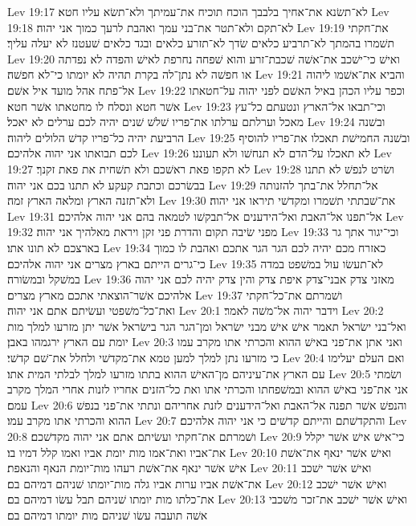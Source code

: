 Lev 19:17  לא־תשׂנא את־אחיך בלבבך הוכח תוכיח את־עמיתך ולא־תשׂא עליו חטא׃
Lev 19:18  לא־תקם ולא־תטר את־בני עמך ואהבת לרעך כמוך אני יהוה׃
Lev 19:19  את־חקתי תשׁמרו בהמתך לא־תרביע כלאים שׂדך לא־תזרע כלאים ובגד כלאים שׁעטנז לא יעלה עליך׃
Lev 19:20  ואישׁ כי־ישׁכב את־אשׁה שׁכבת־זרע והוא שׁפחה נחרפת לאישׁ והפדה לא נפדתה או חפשׁה לא נתן־לה בקרת תהיה לא יומתו כי־לא חפשׁה׃
Lev 19:21  והביא את־אשׁמו ליהוה אל־פתח אהל מועד איל אשׁם׃
Lev 19:22  וכפר עליו הכהן באיל האשׁם לפני יהוה על־חטאתו אשׁר חטא ונסלח לו מחטאתו אשׁר חטא׃
Lev 19:23  וכי־תבאו אל־הארץ ונטעתם כל־עץ מאכל וערלתם ערלתו את־פריו שׁלשׁ שׁנים יהיה לכם ערלים לא יאכל׃
Lev 19:24  ובשׁנה הרביעת יהיה כל־פריו קדשׁ הלולים ליהוה׃
Lev 19:25  ובשׁנה החמישׁת תאכלו את־פריו להוסיף לכם תבואתו אני יהוה אלהיכם׃
Lev 19:26  לא תאכלו על־הדם לא תנחשׁו ולא תעוננו׃
Lev 19:27  לא תקפו פאת ראשׁכם ולא תשׁחית את פאת זקנך׃
Lev 19:28  ושׂרט לנפשׁ לא תתנו בבשׂרכם וכתבת קעקע לא תתנו בכם אני יהוה׃
Lev 19:29  אל־תחלל את־בתך להזנותה ולא־תזנה הארץ ומלאה הארץ זמה׃
Lev 19:30  את־שׁבתתי תשׁמרו ומקדשׁי תיראו אני יהוה׃
Lev 19:31  אל־תפנו אל־האבת ואל־הידענים אל־תבקשׁו לטמאה בהם אני יהוה אלהיכם׃
Lev 19:32  מפני שׂיבה תקום והדרת פני זקן ויראת מאלהיך אני יהוה׃
Lev 19:33  וכי־יגור אתך גר בארצכם לא תונו אתו׃
Lev 19:34  כאזרח מכם יהיה לכם הגר הגר אתכם ואהבת לו כמוך כי־גרים הייתם בארץ מצרים אני יהוה אלהיכם׃
Lev 19:35  לא־תעשׂו עול במשׁפט במדה במשׁקל ובמשׂורה׃
Lev 19:36  מאזני צדק אבני־צדק איפת צדק והין צדק יהיה לכם אני יהוה אלהיכם אשׁר־הוצאתי אתכם מארץ מצרים׃
Lev 19:37  ושׁמרתם את־כל־חקתי ואת־כל־משׁפטי ועשׂיתם אתם אני יהוה׃
Lev 20:1  וידבר יהוה אל־משׁה לאמר׃
Lev 20:2  ואל־בני ישׂראל תאמר אישׁ אישׁ מבני ישׂראל ומן־הגר הגר בישׂראל אשׁר יתן מזרעו למלך מות יומת עם הארץ ירגמהו באבן׃
Lev 20:3  ואני אתן את־פני באישׁ ההוא והכרתי אתו מקרב עמו כי מזרעו נתן למלך למען טמא את־מקדשׁי ולחלל את־שׁם קדשׁי׃
Lev 20:4  ואם העלם יעלימו עם הארץ את־עיניהם מן־האישׁ ההוא בתתו מזרעו למלך לבלתי המית אתו׃
Lev 20:5  ושׂמתי אני את־פני באישׁ ההוא ובמשׁפחתו והכרתי אתו ואת כל־הזנים אחריו לזנות אחרי המלך מקרב עמם׃
Lev 20:6  והנפשׁ אשׁר תפנה אל־האבת ואל־הידענים לזנת אחריהם ונתתי את־פני בנפשׁ ההוא והכרתי אתו מקרב עמו׃
Lev 20:7  והתקדשׁתם והייתם קדשׁים כי אני יהוה אלהיכם׃
Lev 20:8  ושׁמרתם את־חקתי ועשׂיתם אתם אני יהוה מקדשׁכם׃
Lev 20:9  כי־אישׁ אישׁ אשׁר יקלל את־אביו ואת־אמו מות יומת אביו ואמו קלל דמיו בו׃
Lev 20:10  ואישׁ אשׁר ינאף את־אשׁת אישׁ אשׁר ינאף את־אשׁת רעהו מות־יומת הנאף והנאפת׃
Lev 20:11  ואישׁ אשׁר ישׁכב את־אשׁת אביו ערות אביו גלה מות־יומתו שׁניהם דמיהם בם׃
Lev 20:12  ואישׁ אשׁר ישׁכב את־כלתו מות יומתו שׁניהם תבל עשׂו דמיהם בם׃
Lev 20:13  ואישׁ אשׁר ישׁכב את־זכר משׁכבי אשׁה תועבה עשׂו שׁניהם מות יומתו דמיהם בם׃
